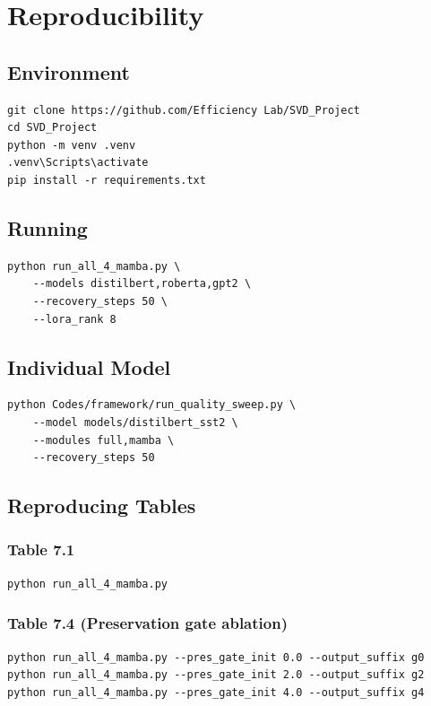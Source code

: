 \section{Reproducibility}

\subsection{Environment}

\begin{lstlisting}
git clone https://github.com/Efficiency Lab/SVD_Project
cd SVD_Project
python -m venv .venv
.venv\Scripts\activate
pip install -r requirements.txt
\end{lstlisting}

\subsection{Running}

\begin{lstlisting}
python run_all_4_mamba.py \
    --models distilbert,roberta,gpt2 \
    --recovery_steps 50 \
    --lora_rank 8
\end{lstlisting}

\subsection{Individual Model}

\begin{lstlisting}
python Codes/framework/run_quality_sweep.py \
    --model models/distilbert_sst2 \
    --modules full,mamba \
    --recovery_steps 50
\end{lstlisting}

\subsection{Reproducing Tables}

\subsubsection{Table 7.1}
\begin{lstlisting}
python run_all_4_mamba.py
\end{lstlisting}

\subsubsection{Table 7.4 (Preservation gate ablation)}
\begin{lstlisting}
python run_all_4_mamba.py --pres_gate_init 0.0 --output_suffix g0
python run_all_4_mamba.py --pres_gate_init 2.0 --output_suffix g2
python run_all_4_mamba.py --pres_gate_init 4.0 --output_suffix g4
\end{lstlisting}

